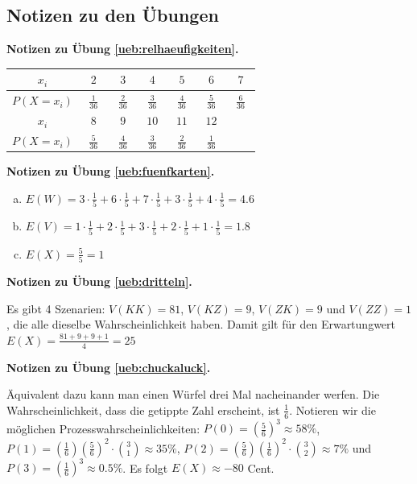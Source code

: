 \documentclass[%
11pt,%
twoside,%
titlepage,%
german,%
headsepline%
]{scrartcl}
\newcommand{\spaltenheight}{\rule{0mm}{3ex}}
\newcommand{\spaltensep}{\\[1ex]}
\newcommand{\concatueb}[1]{ueb:#1}%
\newcommand{\concatlsg}[1]{lsg:#1}%
\newenvironment{lsg}[1]{%
    \par\noindent\textbf{Notizen zu Übung \ref{\concatueb{#1}}.}%
    \label{\concatlsg{#1}}
}{%
    \par%
}
\begin{document}
\clearpage

\subsection{Notizen zu den Übungen}

\begin{lsg}{relhaeufigkeiten}
    \begin{center}
\begin{tabular}{|c|c|c|c|c|c|c|}
\hline
\rowcolor{Gray}\spaltenheight $\;\; x_i\;\;$ & $\;\;2\;\;$ & $\;\;3\;\;$ & $\;\;4\;\;$ & $\;\;5\;\;$ & $\;\;6\;\;$ & $\;\;7\;\;$\spaltensep \hline
\rowcolor{lightyellow}\rule{0mm}{3ex} $P(X=x_i)$ & $\frac{1}{36}$ & $\frac{2}{36}$ & $\frac{3}{36}$ & $\frac{4}{36}$ & $\frac{5}{36}$ & $\frac{6}{36}$\\[1ex] \hline
\rowcolor{Gray}\spaltenheight $\;\; x_i\;\;$ & $\;\;8\;\;$ & $\;\;9\;\;$ & $\;10\;$ & $\;11\;$ & $\;12\;$ & \phantom{$\;12\;$}\spaltensep \hline
\rowcolor{lightyellow}\rule{0mm}{3ex} $P(X=x_i)$ & $\frac{5}{36}$ & $\frac{4}{36}$ & $\frac{3}{36}$ & $\frac{2}{36}$ & $\frac{1}{36}$ & \\[1ex] \hline
\end{tabular}
\end{center}
\end{lsg}
\begin{lsg}{fuenfkarten}
    \begin{enumerate}[a)]
        \item $E(W)=3\cdot\frac{1}{5}+6\cdot\frac{1}{5}+7\cdot\frac{1}{5}+3\cdot\frac{1}{5}+4\cdot\frac{1}{5}=4.6$
        \item $E(V)=1\cdot\frac{1}{5}+2\cdot\frac{1}{5}+3\cdot\frac{1}{5}+2\cdot\frac{1}{5}+1\cdot\frac{1}{5}=1.8$
        \item $E(X)=\frac{5}{5}=1$
    \end{enumerate}
\end{lsg}
\begin{lsg}{dritteln}
    Es gibt 4 Szenarien: $V(KK)=81$, $V(KZ)=9$, $V(ZK)=9$ und $V(ZZ)=1$, die alle dieselbe Wahrscheinlichkeit haben. Damit gilt für den Erwartungwert $E(X)=\frac{81+9+9+1}{4}=25$
\end{lsg}
\begin{lsg}{chuckaluck}
    Äquivalent dazu kann man einen Würfel drei Mal nacheinander werfen. Die Wahrscheinlichkeit, dass die getippte Zahl erscheint, ist $\frac{1}{6}$. Notieren wir die möglichen Prozesswahrscheinlichkeiten: $P(0)=(\frac{5}{6})^3\approx58\%$, $P(1)=(\frac{1}{6})(\frac{5}{6})^2\cdot\binom{3}{1}\approx35\%$, $P(2)=(\frac{5}{6})(\frac{1}{6})^2\cdot\binom{3}{2}\approx7\%$ und $P(3)=(\frac{1}{6})^3\approx0.5\%$. Es folgt $E(X)\approx-80$ Cent.
\end{lsg}
\end{document}
